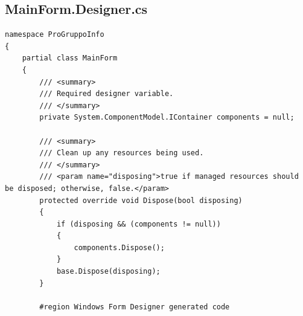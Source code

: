\documentclass[11pt]{article} %
\begin{document}
\subsection{MainForm.Designer.cs}
\begin{lstlisting}
namespace ProGruppoInfo
{
    partial class MainForm
    {
        /// <summary>
        /// Required designer variable.
        /// </summary>
        private System.ComponentModel.IContainer components = null;

        /// <summary>
        /// Clean up any resources being used.
        /// </summary>
        /// <param name="disposing">true if managed resources should be disposed; otherwise, false.</param>
        protected override void Dispose(bool disposing)
        {
            if (disposing && (components != null))
            {
                components.Dispose();
            }
            base.Dispose(disposing);
        }

        #region Windows Form Designer generated code


\end{lstlisting}
\end{document}
